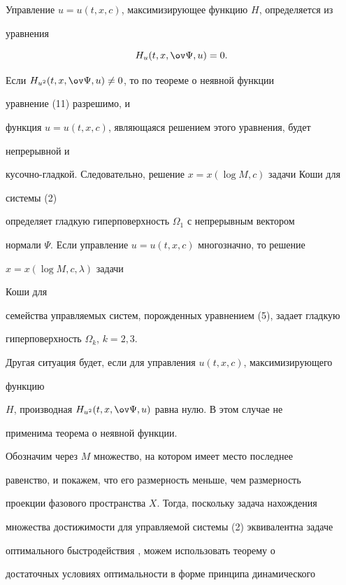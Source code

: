 Управление $u=u(t,x,c)$, максимизирующее функцию $H$, определяется из


уравнения


\begin{equation}


H_u(t,x,\ov\Psi,u)=0.


\end{equation}


Если $H_{u^2}(t,x,\ov\Psi,u)\ne 0$, то по теореме о неявной функции


уравнение (11) разрешимо, и


функция $u=u(t,x,c)$, являющаяся решением этого уравнения, будет


непрерывной и


кусочно-гладкой. Следовательно, решение $x=x(\log M,c)$ задачи Коши для


системы (2)


определяет гладкую гиперповерхность $\Omega_1$ с непрерывным вектором


нормали $\Psi$. Если управление $u=u(t,x,c)$ многозначно, то решение


$x=x(\log M,c,\lambda)$ задачи


Коши для


семейства управляемых систем, порожденных уравнением (5), задает гладкую


гиперповерхность $\Omega_k$, $k=2,3$.





Другая ситуация будет, если для управления $u(t,x,c)$, максимизирующего


функцию


$H$, производная $H_{u^2}(t,x,\ov\Psi,u)$ равна нулю. В этом случае не


применима теорема о неявной функции.





Обозначим через $M$ множество, на котором имеет место последнее


равенство, и покажем, что его размерность меньше, чем размерность


проекции фазового пространства $X$. Тогда, поскольку задача нахождения


множества достижимости для управляемой системы (2) эквивалентна задаче


оптимального быстродействия \cite{3}, можем использовать теорему о


достаточных условиях оптимальности в форме принципа динамического


